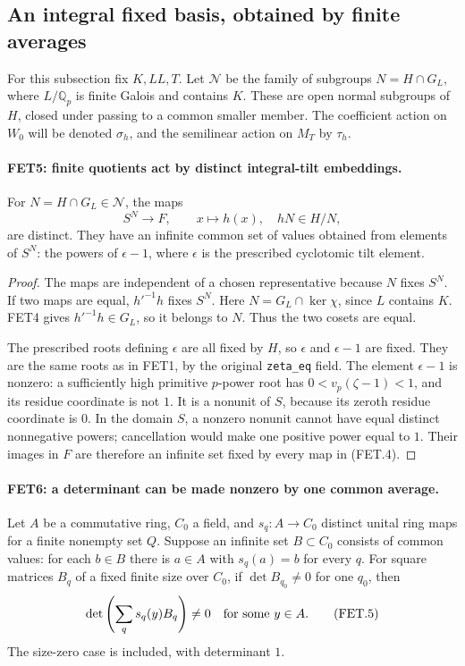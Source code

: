 \documentclass[11pt,a4paper]{article}
\numberwithin{equation}{section}
\theoremstyle{remark}\newtheorem{remark}[theorem]{Remark}
\begin{document}
\subsection{An integral fixed basis, obtained by finite averages}

For this subsection fix $K,LL,T$. Let $\mathcal N$ be the family
of subgroups $N=H\cap G_L$, where $L/\mathbb Q_p$ is finite
Galois and contains $K$. These are open normal subgroups of $H$,
closed under passing to a common smaller member. The coefficient
action on $W_0$ will be denoted $\sigma_h$, and the semilinear
action on $M_T$ by $\tau_h$.

\paragraph{FET5: finite quotients act by distinct integral-tilt embeddings.}
\label{claim:FET5}
For $N=H\cap G_L\in\mathcal N$, the maps
\[
 S^N\longrightarrow F,\qquad x\longmapsto h(x),
                   \quad hN\in H/N,                      \tag{FET.4}
\]
are distinct. They have an infinite common set of values obtained
from elements of $S^N$: the powers of $\epsilon-1$, where
$\epsilon$ is the prescribed cyclotomic tilt element.

\begin{proof}
The maps are independent of a chosen representative because $N$
fixes $S^N$. If two maps are equal, $h'^{-1}h$ fixes $S^N$.
Here $N=G_L\cap\ker\chi$, since $L$ contains $K$.
FET4 gives $h'^{-1}h\in G_L$, so it belongs to $N$.
Thus the two cosets are equal.

The prescribed roots defining $\epsilon$ are all fixed by $H$,
so $\epsilon$ and $\epsilon-1$ are fixed. They are the same roots
as in FET1, by the original \texttt{zeta\_\allowbreak eq} field.
The element $\epsilon-1$ is nonzero: a sufficiently high primitive
$p$-power root has $0<v_p(\zeta-1)<1$, and its residue coordinate
is not $1$. It is a nonunit of $S$, because its zeroth residue
coordinate is $0$. In the domain $S$, a nonzero nonunit cannot
have equal distinct nonnegative powers; cancellation would make
one positive power equal to $1$. Their images in $F$ are therefore
an infinite set fixed by every map in (FET.4).
\end{proof}

\paragraph{FET6: a determinant can be made nonzero by one common average.}
\label{claim:FET6}
Let $A$ be a commutative ring, $C_0$ a field, and
$s_q:A\to C_0$ distinct unital ring maps for a finite nonempty
set $Q$. Suppose an infinite set $B\subset C_0$ consists of
common values: for each $b\in B$ there is $a\in A$ with
$s_q(a)=b$ for every $q$. For square matrices $B_q$ of a fixed
finite size over $C_0$, if $\det B_{q_0}\ne0$ for one $q_0$,
then
\[
              \det\left(\sum_q s_q(y)B_q\right)\ne0
                   \quad\hbox{for some }y\in A.           \tag{FET.5}
\]
The size-zero case is included, with determinant $1$.
\end{document}
